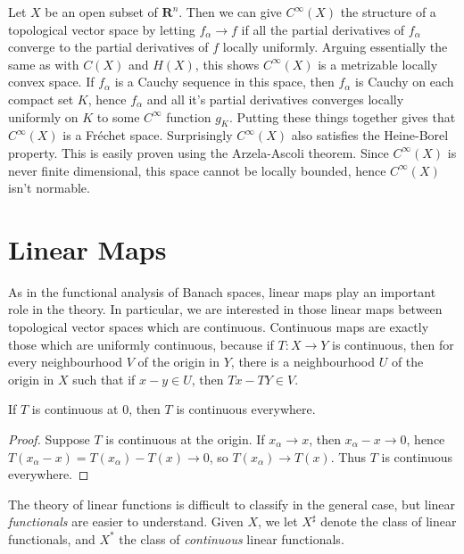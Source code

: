 \begin{example}
    Let $X$ be an open subset of $\mathbf{R}^n$. Then we can give $C^\infty(X)$ the structure of a topological vector space by letting $f_\alpha \to f$ if all the partial derivatives of $f_\alpha$ converge to the partial derivatives of $f$ locally uniformly. Arguing essentially the same as with $C(X)$ and $H(X)$, this shows $C^\infty(X)$ is a metrizable locally convex space. If $f_\alpha$ is a Cauchy sequence in this space, then $f_\alpha$ is Cauchy on each compact set $K$, hence $f_\alpha$ and all it's partial derivatives converges locally uniformly on $K$ to some $C^\infty$ function $g_K$. Putting these things together gives that $C^\infty(X)$ is a Fr\'{e}chet space. Surprisingly $C^\infty(X)$ also satisfies the Heine-Borel property. This is easily proven using the Arzela-Ascoli theorem. Since $C^\infty(X)$ is never finite dimensional, this space cannot be locally bounded, hence $C^\infty(X)$ isn't normable.
\end{example}




\section{Linear Maps}

As in the functional analysis of Banach spaces, linear maps play an important role in the theory. In particular, we are interested in those linear maps between topological vector spaces which are continuous. Continuous maps are exactly those which are uniformly continuous, because if $T: X \to Y$ is continuous, then for every neighbourhood $V$ of the origin in $Y$, there is a neighbourhood $U$ of the origin in $X$ such that if $x - y \in U$, then $Tx - TY \in V$.

\begin{lemma}
    If $T$ is continuous at $0$, then $T$ is continuous everywhere.
\end{lemma}
\begin{proof}
    Suppose $T$ is continuous at the origin. If $x_\alpha \to x$, then $x_\alpha - x \to 0$, hence $T(x_\alpha - x) = T(x_\alpha) - T(x) \to 0$, so $T(x_\alpha) \to T(x)$. Thus $T$ is continuous everywhere.
\end{proof}

The theory of linear functions is difficult to classify in the general case, but linear {\it functionals} are easier to understand. Given $X$, we let $X^\sharp$ denote the class of linear functionals, and $X^*$ the class of {\it continuous} linear functionals.

